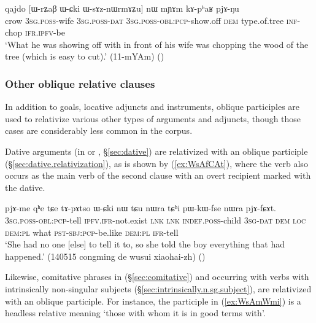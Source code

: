 \begin{exe}
\ex \label{ex:WsAznWrmAZu}
\gll qajdo [ɯ-rʑaβ ɯ-ɕki ɯ-sɤz-nɯrmɤʑu] nɯ mɲɤm kɤ-pʰaʁ pjɤ-ŋu  \\
crow \textsc{3sg}.\textsc{poss}-wife \textsc{3sg}.\textsc{poss}-\textsc{dat} \textsc{3sg}.\textsc{poss}-\textsc{obl}:\textsc{pcp}-show.off \textsc{dem} type.of.tree \textsc{inf}-chop \textsc{ifr}.\textsc{ipfv}-be \\
\glt  `What he was showing off with in front of his wife was chopping the wood of the  tree (which is easy to cut).' (11-mYAm)
()
\end{exe}

\subsubsection{Other oblique relative clauses} \label{sec:other.oblique.participle.relatives}
In addition to goals, locative adjuncts and instruments, oblique participles are used to relativize various other types of arguments and adjuncts, though those cases are considerably less common in the corpus.

Dative arguments (in  or , §\ref{sec:dative}) are relativized with an oblique participle (§\ref{sec:dative.relativization}), as is shown by (\ref{ex:WsAfCAt}),  where the verb  also occurs as the main verb of the second clause with an overt recipient marked with the dative.

\begin{exe}
\ex \label{ex:WsAfCAt}
\gll [ɯ-sɤ-fɕɤt] pjɤ-me qʰe tɕe tɤ-pɤtso ɯ-ɕki nɯ tɕu nɯra tɕʰi pɯ-kɯ-fse nɯra pjɤ-fɕɤt. \\
\textsc{3sg}.\textsc{poss}-\textsc{obl}:\textsc{pcp}-tell \textsc{ipfv}.\textsc{ifr}-not.exist \textsc{lnk} \textsc{lnk} \textsc{indef}.\textsc{poss}-child \textsc{3sg}-\textsc{dat} \textsc{dem} \textsc{loc} \textsc{dem}:\textsc{pl} what \textsc{pst}-\textsc{sbj}:\textsc{pcp}-be.like  \textsc{dem}:\textsc{pl} \textsc{ifr}-tell \\
\glt `She had no one [else] to tell it to, so she told the boy everything that had happened.' (140515 congming de wusui xiaohai-zh) 	()
\end{exe} 

Likewise, comitative phrases in  (§\ref{sec:comitative}) and occurring with verbs with intrinsically non-singular subjects (§\ref{sec:intrinsically.n.sg.subject}), are relativized with an oblique participle. For instance, the participle  in (\ref{ex:WsAmWmi}) is a headless relative meaning `those with whom it is in good terms with'.

